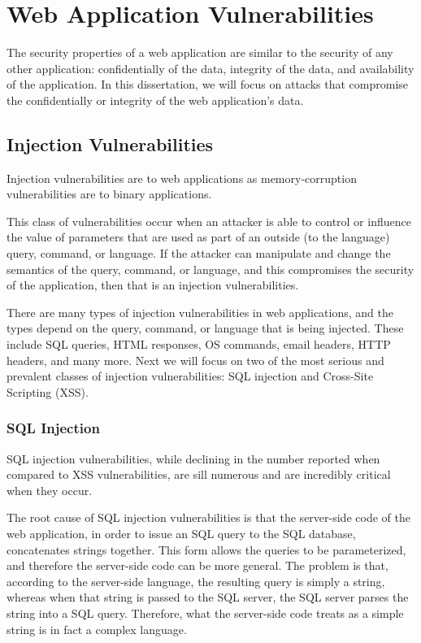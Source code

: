 \section{Web Application Vulnerabilities}

The security properties of a web application are similar to the
security of any other application: confidentially of the data,
integrity of the data, and availability of the application. In this
dissertation, we will focus on attacks that compromise the
confidentially or integrity of the web application's data.

\subsection{Injection Vulnerabilities}

Injection vulnerabilities are to web applications as memory-corruption
vulnerabilities are to binary applications. 

This class of vulnerabilities occur when an attacker is able to
control or influence the value of parameters that are used as part of
an outside (to the language) query, command, or language. If the
attacker can manipulate and change the semantics of the query,
command, or language, and this compromises the security of the
application, then that is an injection vulnerabilities.

There are many types of injection vulnerabilities in web applications,
and the types depend on the query, command, or language that is being
injected. These include SQL queries, HTML responses, OS commands,
email headers, HTTP headers, and many more. Next we will focus on two
of the most serious and prevalent classes of injection
vulnerabilities: SQL injection and Cross-Site Scripting (XSS).

\subsubsection{SQL Injection}

SQL injection vulnerabilities, while declining in the number reported
when compared to XSS vulnerabilities, are sill numerous and are
incredibly critical when they occur.

The root cause of SQL injection vulnerabilities is that the
server-side code of the web application, in order to issue an SQL
query to the SQL database, concatenates strings together. This form
allows the queries to be parameterized, and therefore the server-side
code can be more general. The problem is that, according to the
server-side language, the resulting query is simply a string, whereas
when that string is passed to the SQL server, the SQL server parses
the string into a SQL query. Therefore, what the server-side code
treats as a simple string is in fact a complex language. 

